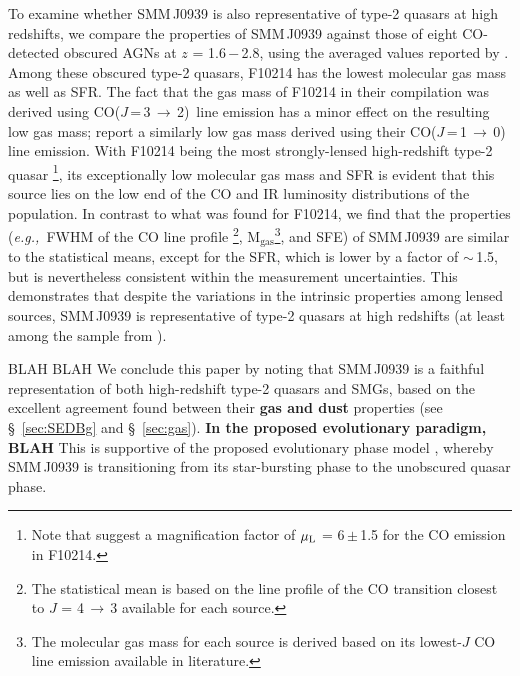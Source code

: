 \documentclass[iop, revtex4]{emulateapj}
\newcommand{\rarr}{$\rightarrow$}
\newcommand{\CO}{\mbox{CO($J$\,=\,3\,$\rightarrow$\,2) }}
\newcommand{\eg}{{\sl e.g.,~}}
\begin{document}
To examine whether SMM\,J0939 is also representative of type-2 quasars at high redshifts, we compare the properties of SMM\,J0939
against those of eight CO-detected obscured AGNs at $z$ = 1.6\,$-$\,2.8, using the averaged values reported by \citet[][and references
therein]{Polletta11a}. 
Among these obscured type-2 quasars, F10214 has the lowest molecular gas mass as well as SFR. The fact that the gas mass of F10214 in their compilation was derived using \CO line emission \citep{Solomon05a} has a minor effect on the resulting low gas mass; \citet{Riechers11a} report
a similarly low gas mass derived using their CO($J$\,=\,1\,\rarr\,0) line emission.
With F10214 being the most strongly-lensed high-redshift type-2 quasar \citep[$\mu_{\textrm L}$ = 17; ][]{Solomon05a}\footnote{Note that \citet{Deane13a} suggest a magnification factor of $\mu_{\textrm L}$ = 6\,$\pm$\,1.5 for the CO emission in F10214.}, its exceptionally low molecular gas mass and SFR is evident that this source lies on the low end of the CO and IR luminosity distributions of the population.
In contrast to what was found for F10214, we find that the properties
(\eg FWHM of the CO line profile \footnote{The statistical mean is based on the line profile of the CO transition closest to $J$ = 4\,\rarr\,3 available for each source.}, M$_\textrm{gas}$\footnote{The molecular gas mass for each source is derived based on its lowest-$J$ CO line emission available in literature.}, and SFE) of SMM\,J0939 are similar to the statistical means, except for the SFR, which is lower by a
factor of $\sim$\,1.5, but is nevertheless consistent within the measurement uncertainties. This demonstrates that despite the variations in the intrinsic properties among lensed sources,
 SMM\,J0939 is representative of type-2 quasars at high redshifts (at least among the sample from \citealt{Polletta11a}).
 
BLAH BLAH
We conclude this paper by noting that SMM\,J0939 is a faithful representation of both high-redshift type-2 quasars and SMGs,
based on the excellent agreement found between their {\bf gas and dust} properties (see \S~\ref{sec:SEDBg} and \S~\ref{sec:gas}).
{\bf In the proposed evolutionary paradigm, BLAH}
This is supportive of the proposed evolutionary phase model \citep[\eg][]{Sanders88,Coppin08a,Simpson12a}, whereby SMM\,J0939 is transitioning from its star-bursting phase to the unobscured quasar phase.
\end{document}
